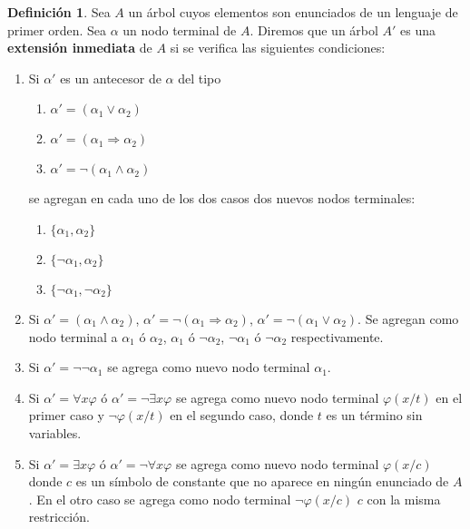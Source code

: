 \documentclass[a4paper,11pt]{article}
\theoremstyle{definition}
\newtheorem{defn}{Definición}[section]
\theoremstyle{remark}
\begin{document}
\begin{defn}
    Sea $A$ un árbol cuyos elementos son enunciados de un lenguaje de
    primer orden. Sea $\alpha$ un nodo terminal de $A$. Diremos que un
    árbol $A'$ es una \textbf{extensión inmediata} de $A$ si se verifica
    las siguientes condiciones:
    
    \begin{enumerate}
        \item Si $\alpha'$ es un antecesor de $\alpha$ del tipo 
        \begin{enumerate}
            \item $\alpha' = (\alpha_1 \lor \alpha_2)$
            \item $\alpha' = (\alpha_1 \Rightarrow \alpha_2)$
            \item $\alpha' = \lnot (\alpha_1 \land \alpha_2)$
        \end{enumerate}
        se agregan en cada uno de los dos casos dos nuevos nodos terminales:
        \begin{enumerate}
            \item $\{\alpha_1, \alpha_2\}$
            \item $\{\lnot \alpha_1, \alpha_2\}$
            \item $\{\lnot \alpha_1, \lnot \alpha_2\}$
        \end{enumerate}
    
        \item Si $\alpha' = (\alpha_1 \land \alpha_2)$,
        $\alpha' = \lnot (\alpha_1 \Rightarrow \alpha_2)$,
        $\alpha' = \lnot (\alpha_1 \lor \alpha_2)$. Se agregan como nodo 
        terminal a $\alpha_1$ ó $\alpha_2$, $\alpha_1$ ó $\lnot \alpha_2$,
        $\lnot \alpha_1$ ó $\lnot \alpha_2$ respectivamente.
        
        \item Si $\alpha' = \lnot\lnot \alpha_1$ se agrega como nuevo
        nodo terminal $\alpha_1$.
        
        \item Si $\alpha' = \forall x \varphi$ ó $\alpha' = \lnot \exists x \varphi$
        se agrega como nuevo nodo terminal $\varphi(x/t)$ en el primer caso y
        $\lnot\varphi(x/t)$ en el segundo caso, donde $t$ es un término sin
        variables.
        
        \item Si $\alpha' = \exists x \varphi$ ó $\alpha' = \lnot \forall x \varphi$
        se agrega como nuevo nodo terminal $\varphi(x/c)$ donde $c$ es un
        símbolo de constante que no aparece en ningún enunciado de $A$.
        En el otro caso se agrega como nodo terminal $\lnot \varphi(x/c)$
        $c$ con la misma restricción.
    \end{enumerate}
\end{defn}
\end{document}
